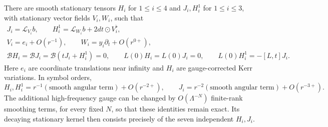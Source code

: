 \begin{lemma}\label{st:profiles}
There are smooth stationary tensors
$H_i$ for $1\leq i\leq4$ and $J_i,H_i^1$ for $1\leq i\leq3$,
with stationary vector fields $V_i,W_i$, such that
\begin{gather}
 J_i=\mathcal L_{V_i}b,\qquad
 H_i^1=\mathcal L_{W_i}b+2dt\odot V_i^\flat,
 \label{st:profile-definition}\\
 V_i=e_i+O(r^{-1}),\qquad
 W_i=y_i\partial_t+O(r^{0+}),
 \label{st:vector-profiles}\\
 \mathcal BH_i=\mathcal BJ_i
   =\mathcal B(tJ_i+H_i^1)=0,
 \qquad
 L(0)H_i=L(0)J_i=0,\qquad
 L(0)H_i^1=-[L,t]J_i.
 \label{st:profile-identities}
\end{gather}
Here $e_i$ are coordinate translations near infinity and $H_i$
are gauge-corrected Kerr variations.  In symbol orders,
\begin{equation}\label{st:profile-tails}
 H_i,H_i^1=r^{-1}(\text{smooth angular term})+O(r^{-2+}),
 \qquad
 J_i=r^{-2}(\text{smooth angular term})+O(r^{-3+}).
\end{equation}
The additional high-frequency gauge can be changed by
$O(\Lambda^{-N})$ finite-rank smoothing terms, for every fixed
$N$, so that these identities remain exact.  Its decaying
stationary kernel then consists precisely of the seven
independent $H_i,J_i$.
\end{lemma}

